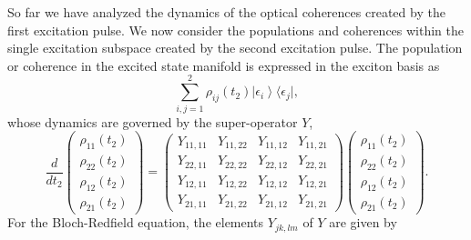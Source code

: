 \documentclass[%
 reprint,%
 amssymb, amsmath,%
 aip,cha,%
]{revtex4-1}
\newcommand{\ket}[1]{\ensuremath{\left|{#1}\right\rangle}}
\begin{document}
So far we have analyzed the dynamics of the optical coherences created by the first excitation pulse. We now consider the populations and coherences within the single excitation subspace created by the second excitation pulse.  The population or coherence in the excited state manifold is expressed in the exciton basis as
\begin{equation}
	\sum_{i,j=1}^{2}\rho_{ij}(t_2)\ket{\epsilon_i}\mathrm{\langle}\epsilon_j\mathrm{|},
\end{equation}
whose dynamics are governed by the super-operator $Y$,
\begin{equation}
\frac{d}{dt_2}
\begin{pmatrix}
	\rho_{11}(t_2) \\ \rho_{22}(t_2) \\ \rho_{12}(t_2) \\ \rho_{21}(t_2)
\end{pmatrix}
=
\begin{pmatrix}
	Y_{11,11} & Y_{11,22} & Y_{11,12} & Y_{11,21} \\
	Y_{22,11} & Y_{22,22} & Y_{22,12} & Y_{22,21} \\
	Y_{12,11} & Y_{12,22} & Y_{12,12} & Y_{12,21} \\
	Y_{21,11} & Y_{21,22} & Y_{21,12} & Y_{21,21}
\end{pmatrix}
\begin{pmatrix}
	\rho_{11}(t_2) \\ \rho_{22}(t_2) \\ \rho_{12}(t_2) \\ \rho_{21}(t_2)
\end{pmatrix}.
\end{equation}
For the Bloch-Redfield equation, the elements $Y_{jk,lm}$ of $Y$ are given by
\end{document}
